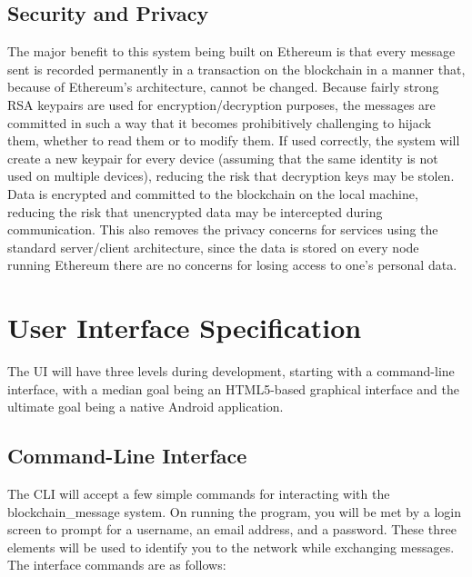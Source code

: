 \documentclass[titlepage]{report}
\begin{document}
\subsection{Security and Privacy}
The major benefit to this system being built on Ethereum is that every message sent is recorded permanently in a transaction on the blockchain in a manner that, because of Ethereum's architecture, cannot be changed. Because fairly strong RSA keypairs are used for encryption/decryption purposes, the messages are committed in such a way that it becomes prohibitively challenging to hijack them, whether to read them or to modify them. If used correctly, the system will create a new keypair for every device (assuming that the same identity is not used on multiple devices), reducing the risk that decryption keys may be stolen. Data is encrypted and committed to the blockchain on the local machine, reducing the risk that unencrypted data may be intercepted during communication. This also removes the privacy concerns for services using the standard server/client architecture, since the data is stored on every node running Ethereum there are no concerns for losing access to one's personal data.

\section{User Interface Specification}
The UI will have three levels during development, starting with a command-line interface, with a median goal being an HTML5-based graphical interface and the ultimate goal being a native Android application.

\subsection{Command-Line Interface}
The CLI will accept a few simple commands for interacting with the blockchain\_message system. On running the program, you will be met by a login screen to prompt for a username, an email address, and a password. These three elements will be used to identify you to the network while exchanging messages.
The interface commands are as follows:
\end{document}
